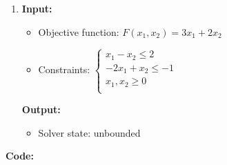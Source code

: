 \documentclass{article}
\newcommand{\Gap}{0.25in}
\begin{document}
\begin{enumerate}[label={(\arabic*)}]
          \vspace{\Gap}

    \item \textbf{Input:}
          \begin{itemize}
              \item Objective function: \(F(x_1, x_2) = 3 x_1 + 2 x_2\)
              \item Constraints: \(\begin{cases}
                        x_1 - x_2 \le 2     \\
                        -2 x_1 + x_2 \le -1 \\
                        x_1, x_2 \ge 0      \\
                    \end{cases}\)
          \end{itemize}

          \textbf{Output:}
          \begin{itemize}
              \item Solver state: unbounded
          \end{itemize}
\end{enumerate}

\newpage

\textbf{Code:}


\newpage


\newpage

\end{document}

